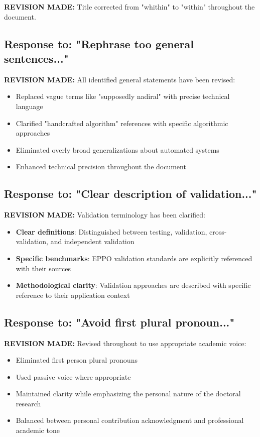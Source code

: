 \documentclass[11pt,a4paper]{article}
\begin{document}
\textbf{REVISION MADE:} Title corrected from "whithin" to "within" throughout the document.

\subsection{Response to: "Rephrase too general sentences..."}

\textbf{REVISION MADE:} All identified general statements have been revised:
\begin{itemize}
\item Replaced vague terms like "supposedly nadiral" with precise technical language
\item Clarified "handcrafted algorithm" references with specific algorithmic approaches
\item Eliminated overly broad generalizations about automated systems
\item Enhanced technical precision throughout the document
\end{itemize}

\subsection{Response to: "Clear description of validation..."}

\textbf{REVISION MADE:} Validation terminology has been clarified:
\begin{itemize}
\item \textbf{Clear definitions}: Distinguished between testing, validation, cross-validation, and independent validation
\item \textbf{Specific benchmarks}: EPPO validation standards are explicitly referenced with their sources
\item \textbf{Methodological clarity}: Validation approaches are described with specific reference to their application context
\end{itemize}

\subsection{Response to: "Avoid first plural pronoun..."}

\textbf{REVISION MADE:} Revised throughout to use appropriate academic voice:
\begin{itemize}
\item Eliminated first person plural pronouns
\item Used passive voice where appropriate
\item Maintained clarity while emphasizing the personal nature of the doctoral research
\item Balanced between personal contribution acknowledgment and professional academic tone
\end{itemize}
\end{document}
